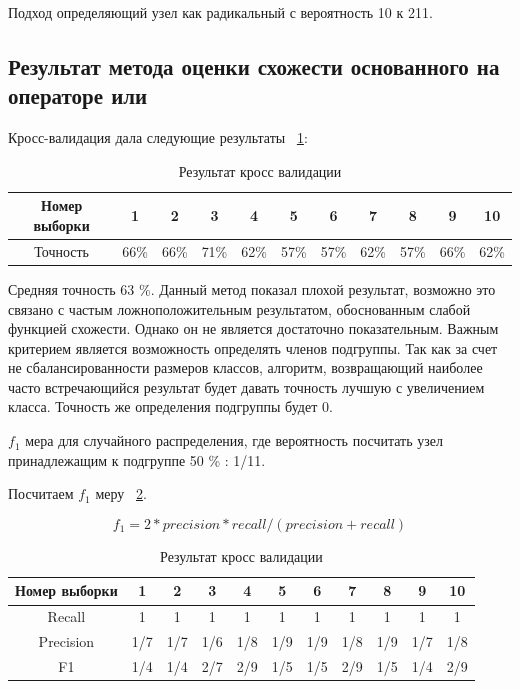 \documentclass[annotation,times,page4]{itmo-student-thesis}
\begin{document}
Подход определяющий узел как радикальный с вероятность 10 к 211.
\subsection{Результат метода оценки схожести основанного на операторе или}

Кросс-валидация дала следующие результаты {~\ref{tab2}}:

\begin{table}[!h]
\caption{Результат кросс валидации}\label{tab2}
\centering
\begin{tabular}{|*{11}{c|}}\hline
Номер выборки & 1 & 2 & 3 & 4 & 5 & 6 & 7 & 8 & 9 & 10 \\\hline
Точность  & 66\% & 66\% & 71\% & 62\% & 57\% & 57\% & 62\% & 57\% & 66\% & 62\% \\\hline
\end{tabular}
\end{table}

Средняя точность 63 \%. Данный метод показал плохой результат, возможно это связано с частым ложноположительным результатом, обоснованным слабой функцией схожести. Однако он не является достаточно показательным. Важным критерием является возможность определять членов подгруппы. Так как за счет не сбалансированности размеров классов, алгоритм, возвращающий наиболее часто встречающийся результат будет давать точность лучшую с увеличением класса. Точность же определения подгруппы будет 0.

$f_{1}$ мера для случайного распределения, где вероятность посчитать узел принадлежащим к подгруппе 50 \% : 1/11.

Посчитаем $f_{1}$ меру ~\ref{tab3}.

\[
    f_{1} = 2 * precision * recall / (precision + recall)
\] 

\begin{table}[!h]
\caption{Результат кросс валидации}\label{tab3}
\centering
\begin{tabular}{|*{11}{c|}}\hline
Номер выборки & 1 & 2 & 3 & 4 & 5 & 6 & 7 & 8 & 9 & 10 \\\hline
Recall  & 1& 1& 1& 1& 1& 1& 1& 1& 1& 1\\\hline
Precision & 1/7 & 1/7& 1/6& 1/8& 1/9& 1/9& 1/8 & 1/9& 1/7& 1/8\\\hline
F1 & 1/4 & 1/4 & 2/7 & 2/9 & 1/5 & 1/5 & 2/9 & 1/5 & 1/4 & 2/9 \\\hline

\end{tabular}
\end{table}
\end{document}
